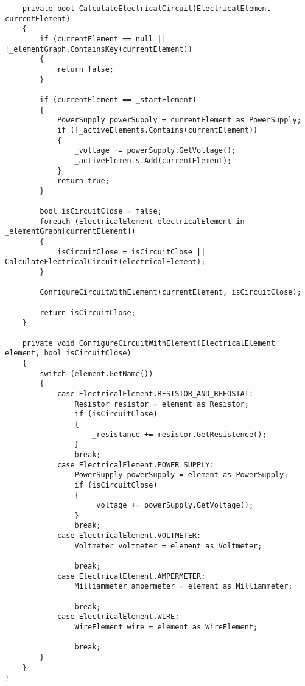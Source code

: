 \begin{verbatim}
    private bool CalculateElectricalCircuit(ElectricalElement currentElement)
    {
        if (currentElement == null || !_elementGraph.ContainsKey(currentElement))
        {
            return false;
        }

        if (currentElement == _startElement)
        {
            PowerSupply powerSupply = currentElement as PowerSupply;
            if (!_activeElements.Contains(currentElement))
            {
                _voltage += powerSupply.GetVoltage();
                _activeElements.Add(currentElement);
            }
            return true;
        }

        bool isCircuitClose = false;
        foreach (ElectricalElement electricalElement in _elementGraph[currentElement])
        {
            isCircuitClose = isCircuitClose || CalculateElectricalCircuit(electricalElement);
        }

        ConfigureCircuitWithElement(currentElement, isCircuitClose);

        return isCircuitClose;
    }

    private void ConfigureCircuitWithElement(ElectricalElement element, bool isCircuitClose)
    {
        switch (element.GetName())
        {
            case ElectricalElement.RESISTOR_AND_RHEOSTAT:
                Resistor resistor = element as Resistor;
                if (isCircuitClose)
                {
                    _resistance += resistor.GetResistence();
                }
                break;
            case ElectricalElement.POWER_SUPPLY:
                PowerSupply powerSupply = element as PowerSupply;
                if (isCircuitClose)
                {
                    _voltage += powerSupply.GetVoltage();
                }
                break;
            case ElectricalElement.VOLTMETER:
                Voltmeter voltmeter = element as Voltmeter;

                break;
            case ElectricalElement.AMPERMETER:
                Milliammeter ampermeter = element as Milliammeter;

                break;
            case ElectricalElement.WIRE:
                WireElement wire = element as WireElement;

                break;
        }
    }
}

\end{verbatim}
